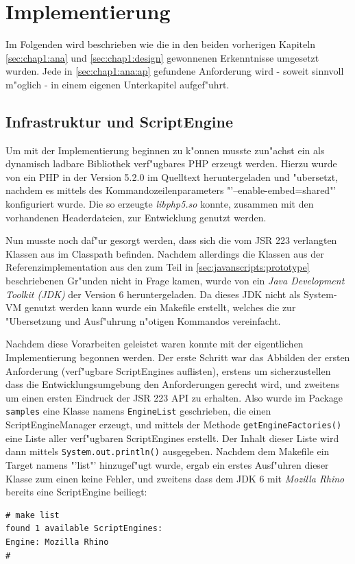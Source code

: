 
\section{Implementierung}
\label{sec:chap1:impl}

Im Folgenden wird beschrieben wie die in den beiden vorherigen Kapiteln \ref{sec:chap1:ana} und \ref{sec:chap1:design}
gewonnenen Erkenntnisse umgesetzt wurden. Jede in \ref{sec:chap1:ana:ap} gefundene Anforderung wird - soweit sinnvoll
m"oglich - in einem eigenen Unterkapitel aufgef"uhrt.

\subsection{Infrastruktur und ScriptEngine}
\label{sec:chap1:impl:1}

Um mit der Implementierung beginnen zu k"onnen musste zun"achst ein als dynamisch ladbare Bibliothek verf"ugbares
PHP erzeugt werden. Hierzu wurde von \cite{PHPHP} ein PHP in der Version 5.2.0 im Quelltext heruntergeladen und 
"ubersetzt, nachdem es mittels des Kommandozeilenparameters "'--enable-embed=shared"' konfiguriert wurde. Die so
erzeugte \emph{libphp5.so} konnte, zusammen mit den vorhandenen Headerdateien, zur Entwicklung genutzt werden.

Nun musste noch daf"ur gesorgt werden, dass sich die vom JSR 223 verlangten Klassen aus  im
Classpath befinden. Nachdem allerdings die Klassen aus der Referenzimplementation aus den zum Teil in 
\ref{sec:javanscripts:prototype} beschriebenen Gr"unden nicht in Frage kamen, wurde von \cite{JAVAHP} ein
\emph{Java Development Toolkit (JDK)} der Version 6 heruntergeladen. Da dieses JDK nicht als System-VM genutzt
werden kann wurde ein Makefile erstellt, welches die zur "Ubersetzung und Ausf"uhrung n"otigen Kommandos
vereinfacht.

Nachdem diese Vorarbeiten geleistet waren konnte mit der eigentlichen Implementierung begonnen werden.
Der erste Schritt war das Abbilden der ersten Anforderung (verf"ugbare ScriptEngines auflisten), erstens um 
sicherzustellen dass die Entwicklungsumgebung den Anforderungen gerecht wird, und zweitens um einen ersten
Eindruck der JSR 223 API zu erhalten. Also wurde im Package \texttt{samples} eine Klasse namens
\texttt{EngineList} geschrieben, die einen ScriptEngineManager erzeugt, und mittels der Methode
\texttt{getEngineFactories()} eine Liste aller verf"ugbaren ScriptEngines erstellt. Der Inhalt dieser
Liste wird dann mittels \texttt{System.out.println()} ausgegeben. 
Nachdem dem Makefile ein Target namens "'list"' hinzugef"ugt wurde, ergab ein erstes Ausf"uhren dieser Klasse
zum einen keine Fehler, und zweitens dass dem JDK 6 mit \emph{Mozilla Rhino} bereits eine ScriptEngine beiliegt:
\begin{lstlisting}[caption=erste Tests]
# make list
found 1 available ScriptEngines:
Engine: Mozilla Rhino
#
\end{lstlisting}

